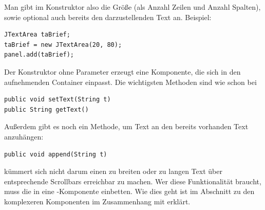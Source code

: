 Man gibt im Konstruktor also die Größe (als Anzahl Zeilen und Anzahl Spalten),
sowie optional auch bereits den darzustellenden Text an. Beispiel:

\begin{lstlisting}
JTextArea taBrief;
taBrief = new JTextArea(20, 80);
panel.add(taBrief);
\end{lstlisting}

Der Konstruktor ohne Parameter erzeugt eine Komponente, die sich in den
aufnehmenden Container einpasst. Die wichtigsten Methoden sind wie schon bei

\begin{lstlisting}
public void setText(String t)
public String getText()
\end{lstlisting}

Außerdem gibt es noch ein Methode, um Text an den bereits vorhanden Text
anzuhängen:

\begin{lstlisting}
public void append(String t)
\end{lstlisting}

 kümmert sich nicht darum einen zu breiten oder zu langen
Text über entsprechende Scrollbars erreichbar zu machen. Wer diese
Funktionalität braucht, muss die  in eine
-Komponente einbetten. Wie dies geht ist im Abschnitt zu
den komplexeren Komponenten im Zusammenhang mit  erklärt.
